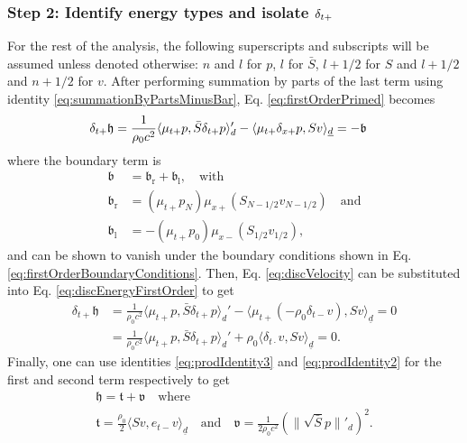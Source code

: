 {\subsubsection{Step 2: Identify energy types and isolate $\delta_{t+}$}
For the rest of the analysis, the following superscripts and subscripts will be assumed unless denoted otherwise: $n$ and $l$ for $p$, $l$ for $\bar S$, $l+1/2$ for $S$ and $l+1/2$ and $n+1/2$ for $v$. After performing summation by parts of the last term using identity \eqref{eq:summationByPartsMinusBar}, Eq. \eqref{eq:firstOrderPrimed} becomes
\begin{equation}\label{eq:discEnergyFirstOrder}
    \delta_{t+}\mathfrak{h} = \frac{1}{\rho_0 c^2}\langle \mu_{t+}p, \bar S \delta_{t+}p \rangle_{d}' -\langle \mu_{t+}\delta_{x+} p, Sv\rangle_{\underline{d}} = -\mathfrak{b} \quad \end{equation}
where the boundary term is
\begin{align}
    \mathfrak{b} &= \mathfrak{b}_\text{r} + \mathfrak{b}_\text{l}, \quad \text{with} \nonumber\\
    \mathfrak{b}_\text{r} &= (\mu_{t+}p_N)\mu_{x+}(S_{N-1/2}v_{N-1/2})\quad \text{and}\label{eq:firstOrderRightBoundary}\\
    \mathfrak{b}_\text{l} &= -(\mu_{t+}p_0)\mu_{x-}(S_{1/2}v_{1/2})\label{eq:firstOrderLeftBoundary},
\end{align}
and can be shown to vanish under the boundary conditions shown in Eq. \eqref{eq:firstOrderBoundaryConditions}. Then, Eq. \eqref{eq:discVelocity} can be substituted into Eq. \eqref{eq:discEnergyFirstOrder} to get
\begin{align}
    \delta_{t+}\mathfrak{h} &= \frac{1}{\rho_0 c^2}\langle \mu_{t+}p, \bar S \delta_{t+}p \rangle_{d}' -\langle \mu_{t+}(-\rho_0\delta_{t-}v), Sv\rangle_{\underline{d}} = 0\\
    &= \frac{1}{\rho_0 c^2}\langle \mu_{t+}p, \bar S \delta_{t+}p \rangle_{d}' + \rho_0 \langle \delta_{t\cdot}v, Sv\rangle_{\underline{d}} = 0.
\end{align}
Finally, one can use identities \eqref{eq:prodIdentity3} and \eqref{eq:prodIdentity2} for the first and second term respectively to get
\begin{equation}\label{eq:energyBalanceFirstOrder}
    \begin{gathered}
        \mathfrak{h} = \mathfrak{t} + \mathfrak{v}\quad \text{where}\\
       \mathfrak{t} = \frac{\rho_0}{2}\langle Sv, e_{t-}v\rangle_{\underline{d}}\quad \text{and} \quad \mathfrak{v} = \frac{1}{2\rho_0 c^2}\left(\lVert\sqrt{\bar S }p\rVert'_d\right)^2.
    \end{gathered}
\end{equation}
}
